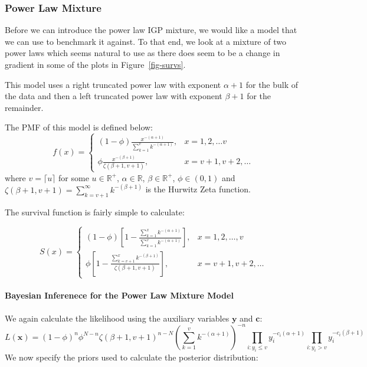 \documentclass[
]{article}
\let\oldparagraph\paragraph
\renewcommand{\paragraph}[1]{\oldparagraph{#1}\mbox{}}
\begin{document}
\hypertarget{sec-plpl}{%
\subsubsection{Power Law Mixture}\label{sec-plpl}}

Before we can introduce the power law IGP mixture, we would like a model
that we can use to benchmark it against. To that end, we look at a
mixture of two power laws which seems natural to use as there does seem
to be a change in gradient in some of the plots in
Figure~\ref{fig-survs}.

This model uses a right truncated power law with exponent \(\alpha+1\)
for the bulk of the data and then a left truncated power law with
exponent \(\beta+1\) for the remainder.

The PMF of this model is defined below: \[
f(x) = \begin{cases}
(1-\phi)\frac{x^{-(\alpha+1)}}{\sum_{k=1}^v k^{-(\alpha+1)}}, &x=1,2,\ldots v\\
\phi\frac{x^{-(\beta+1)}}{\zeta(\beta+1, v+1)}, &x=v+1,v+2,\ldots
\end{cases}
\] where \(v=\lceil u\rceil\) for some \(u\in\mathbb{R}^+\),
\(\alpha\in\mathbb{R}\), \(\beta\in\mathbb{R}^+\), \(\phi\in(0,1)\) and
\(\zeta(\beta+1, v+1) = \sum_{k=v+1}^\infty k^{-(\beta+1)}\) is the
Hurwitz Zeta function.

The survival function is fairly simple to calculate:

\[
S(x) = \begin{cases}
(1-\phi)\left[1-\frac{\sum_{k=1}^x k^{-(\alpha+1)}}{\sum_{k=1}^v k^{-(\alpha+1)}}\right],&x=1,2,\ldots,v \\
\phi\left[1-\frac{\sum_{k=v+1}^x k^{-(\beta+1)}}{\zeta(\beta+1, v+1)}\right],&x=v+1,v+2,\ldots
\end{cases}
\]

\hypertarget{bayesian-inferenece-for-the-power-law-mixture-model}{%
\paragraph{Bayesian Inferenece for the Power Law Mixture
Model}\label{bayesian-inferenece-for-the-power-law-mixture-model}}

We again calculate the likelihood using the auxiliary variables
\(\boldsymbol{y}\) and \(\boldsymbol{c}\): \[
L(\boldsymbol{x}) = (1-\phi)^n\phi^{N-n}\zeta(\beta+1, v+1)^{n-N}\left(\sum_{k=1}^v k^{-(\alpha+1)}\right)^{-n}\prod_{i:y_i\le v}y_i^{-c_i(\alpha+1)}\prod_{i:y_i>v}y_i^{-c_i(\beta+1)}
\] We now specify the priors used to calculate the posterior
distribution:
\end{document}
